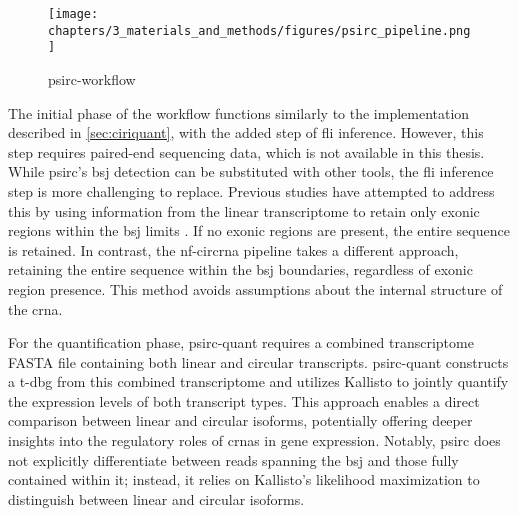 \begin{figure}[ht] \centering

    \texttt{[image: chapters/3\_materials\_and\_methods/figures/psirc\_pipeline.png]}
    \caption{psirc-workflow} \label{fig:psirc_workflow} \end{figure}

The initial phase of the workflow functions similarly to the implementation
described in \cref{sec:ciriquant}, with the added step of \gls{fli} inference.
However, this step requires paired-end sequencing data, which is not available
in this thesis.
While \gls{psirc}'s \gls{bsj} detection can be substituted with other tools,
the \gls{fli} inference step is more challenging to replace.
Previous studies have attempted to address this by using information from the
linear transcriptome to retain only exonic regions within the \gls{bsj} limits
\supercite{hoffmann_circrna-sponging_2023}.
If no exonic regions are present, the entire sequence is retained.
In contrast, the \gls{nf-circrna} pipeline takes a different approach,
retaining the entire sequence within the \gls{bsj} boundaries, regardless of
exonic region presence.
This method avoids assumptions about the internal structure of the \gls{crna}.

For the quantification phase, \gls{psirc-quant} requires a combined
transcriptome FASTA file containing both linear and circular transcripts.
\Gls{psirc-quant} constructs a \gls{t-dbg} from this combined
transcriptome and utilizes Kallisto to jointly quantify the expression levels
of both transcript types\supercite{yu_quantifying_2021}.
This approach enables a direct comparison between linear and circular isoforms,
potentially offering deeper insights into the regulatory roles of \glspl{crna}
in gene expression.
Notably, \gls{psirc} does not explicitly differentiate between reads spanning
the \gls{bsj} and those fully contained within it; instead, it relies on
Kallisto's likelihood maximization to distinguish between linear and circular
isoforms\supercite{yu_quantifying_2021}.
